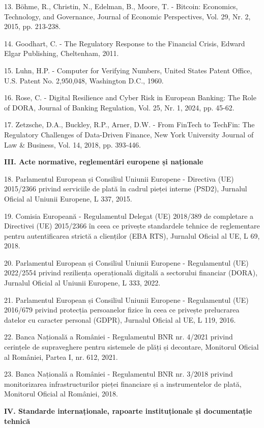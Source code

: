 \documentclass[
]{article}
\begin{document}
13. Böhme, R., Christin, N., Edelman, B., Moore, T. - Bitcoin:
Economics, Technology, and Governance, Journal of Economic Perspectives,
Vol. 29, Nr. 2, 2015, pp. 213-238.

14. Goodhart, C. - The Regulatory Response to the Financial Crisis,
Edward Elgar Publishing, Cheltenham, 2011.

15. Luhn, H.P. - Computer for Verifying Numbers, United States Patent
Office, U.S. Patent No. 2,950,048, Washington D.C., 1960.

16. Rose, C. - Digital Resilience and Cyber Risk in European Banking:
The Role of DORA, Journal of Banking Regulation, Vol. 25, Nr. 1, 2024,
pp. 45-62.

17. Zetzsche, D.A., Buckley, R.P., Arner, D.W. - From FinTech to
TechFin: The Regulatory Challenges of Data-Driven Finance, New York
University Journal of Law \& Business, Vol. 14, 2018, pp. 393-446.

\textbf{III. Acte normative, reglementări europene și naționale}

18. Parlamentul European și Consiliul Uniunii Europene - Directiva (UE)
2015/2366 privind serviciile de plată în cadrul pieței interne (PSD2),
Jurnalul Oficial al Uniunii Europene, L 337, 2015.

19. Comisia Europeană - Regulamentul Delegat (UE) 2018/389 de completare
a Directivei (UE) 2015/2366 în ceea ce privește standardele tehnice de
reglementare pentru autentificarea strictă a clienților (EBA RTS),
Jurnalul Oficial al UE, L 69, 2018.

20. Parlamentul European și Consiliul Uniunii Europene - Regulamentul
(UE) 2022/2554 privind reziliența operațională digitală a sectorului
financiar (DORA), Jurnalul Oficial al Uniunii Europene, L 333, 2022.

21. Parlamentul European și Consiliul Uniunii Europene - Regulamentul
(UE) 2016/679 privind protecția persoanelor fizice în ceea ce privește
prelucrarea datelor cu caracter personal (GDPR), Jurnalul Oficial al UE,
L 119, 2016.

22. Banca Națională a României - Regulamentul BNR nr. 4/2021 privind
cerințele de supraveghere pentru sistemele de plăți și decontare,
Monitorul Oficial al României, Partea I, nr. 612, 2021.

23. Banca Națională a României - Regulamentul BNR nr. 3/2018 privind
monitorizarea infrastructurilor pieței financiare și a instrumentelor de
plată, Monitorul Oficial al României, 2018.

\textbf{IV. Standarde internaționale, rapoarte instituționale și
documentație tehnică}
\end{document}
